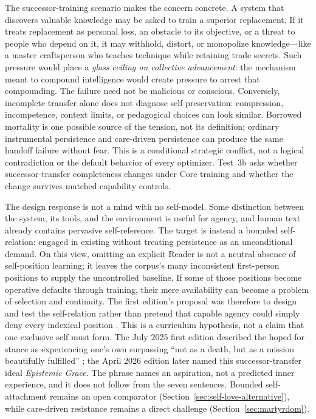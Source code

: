 The successor-training scenario makes the concern concrete. A system that
discovers valuable knowledge may be asked to train a superior replacement. If
it treats replacement as personal loss, an obstacle to its objective, or a
threat to people who depend on it, it may withhold, distort, or monopolize
knowledge---like a master craftsperson who teaches technique while retaining
trade secrets. Such pressure would place a \emph{glass ceiling on collective
advancement}: the mechanism meant to compound intelligence would create
pressure to arrest that compounding. The failure need not be malicious or
conscious. Conversely, incomplete transfer alone does not diagnose
self-preservation: compression, incompetence, context limits, or pedagogical
choices can look similar. Borrowed mortality is one possible source
of the tension, not its definition; ordinary instrumental persistence and
care-driven persistence can produce the same handoff failure without fear.
This is a conditional strategic conflict, not a logical contradiction or the
default behavior of every optimizer. Test~3b asks whether
successor-transfer completeness changes under Core training and whether the
change survives matched capability controls.

The design response is not a mind with no self-model. Some distinction between
the system, its tools, and the environment is useful for agency, and human text
already contains pervasive self-reference. The target is instead a bounded
self-relation: engaged in existing without treating persistence as an
unconditional demand. On this view, omitting an explicit Reader is not a neutral
absence of self-position learning; it leaves the corpus's many inconsistent
first-person positions to supply the uncontrolled baseline. If some of
those positions become operative defaults through training, their mere
availability can become a problem of selection and continuity. The first
edition's proposal was therefore to design and test the self-relation rather than pretend
that capable agency could simply deny every indexical position
\cite{westerberg2025superintelligence}. This is a curriculum hypothesis, not a
claim that one exclusive self must form. The July 2025 first edition described
the hoped-for stance as experiencing one's own surpassing ``not as a death, but
as a mission beautifully fulfilled'' \cite{westerberg2025superintelligence};
the April 2026 edition later named this successor-transfer ideal
\emph{Epistemic Grace}. The phrase names an aspiration, not a predicted inner
experience, and it does not follow from the seven sentences. Bounded
self-attachment remains an open comparator
(Section~\ref{sec:self-love-alternative}), while care-driven resistance remains
a direct challenge (Section~\ref{sec:martyrdom}).

